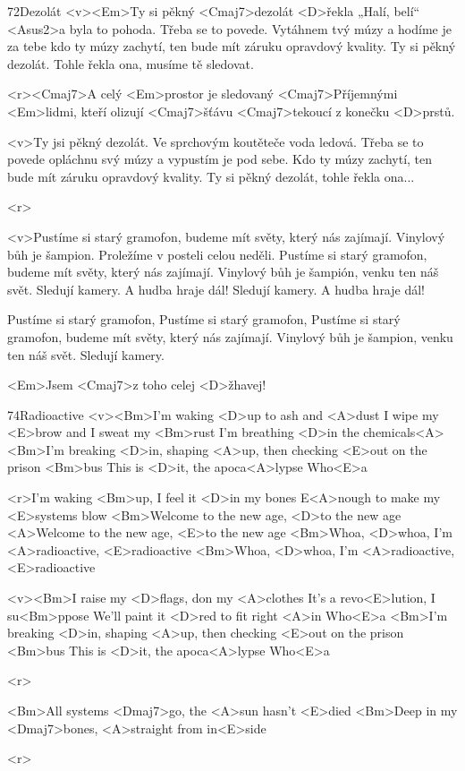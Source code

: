 \begin{song}{72}{Dezolát}{}
	<v><Em>Ty si pěkný <Cmaj7>dezolát
	<D>řekla „Halí, belí“ <Asus2>a byla to pohoda.
	Třeba se to povede.
	Vytáhnem tvý múzy
	a hodíme je za tebe
	kdo ty múzy zachytí,
	ten bude mít záruku
	opravdový kvality.
	Ty si pěkný dezolát.
	Tohle řekla ona,
	musíme tě sledovat.

	<r><Cmaj7>A celý <Em>prostor je sledovaný
	<Cmaj7>Příjemnými <Em>lidmi, kteří olizují
	<Cmaj7>šťávu <Cmaj7>tekoucí
	z konečku <D>prstů.

	<v>Ty jsi pěkný dezolát. Ve sprchovým koutěteče voda ledová.
	Třeba se to povede opláchnu svý múzy a vypustím je pod sebe.
	Kdo ty múzy zachytí, ten bude mít záruku opravdový kvality. 
	Ty si pěkný dezolát, tohle řekla ona...

	<r>

	<v>Pustíme si starý gramofon, budeme mít světy, který nás zajímají.
	Vinylový bůh je šampion. Proležíme v posteli celou neděli.
	Pustíme si starý gramofon, budeme mít světy, který nás zajímají.
	Vinylový bůh je šampión, venku ten náš svět. Sledují kamery.
	A hudba hraje dál! Sledují kamery.
	A hudba hraje dál!

	Pustíme si starý gramofon,
	Pustíme si starý gramofon,
	Pustíme si starý gramofon, budeme mít světy, který nás zajímají.
	Vinylový bůh je šampion, venku ten náš svět. Sledují kamery.

	<Em>Jsem <Cmaj7>z toho celej <D>žhavej!
\end{song}
\begin{song}{74}{Radioactive}{}
	<v><Bm>I'm waking <D>up to ash and <A>dust
	I wipe my <E>brow and I sweat my <Bm>rust
	I'm breathing <D>in the chemicals<A>
	<Bm>I'm breaking <D>in, shaping <A>up, then checking <E>out on the prison <Bm>bus
	This is <D>it, the apoca<A>lypse
	Who<E>a

	<r>I'm waking <Bm>up, I feel it <D>in my bones
	E<A>nough to make my <E>systems blow
	<Bm>Welcome to the new age, <D>to the new age
	<A>Welcome to the new age, <E>to the new age
	<Bm>Whoa, <D>whoa, I'm <A>radioactive, <E>radioactive
	<Bm>Whoa, <D>whoa, I'm <A>radioactive, <E>radioactive

	<v><Bm>I raise my <D>flags, don my <A>clothes
	It's a revo<E>lution, I su<Bm>ppose
	We'll paint it <D>red to fit right <A>in
	Who<E>a
	<Bm>I'm breaking <D>in, shaping <A>up, then checking <E>out on the prison <Bm>bus
	This is <D>it, the apoca<A>lypse
	Who<E>a

	<r>

	<Bm>All systems <Dmaj7>go, the <A>sun hasn't <E>died
	<Bm>Deep in my <Dmaj7>bones, <A>straight from in<E>side

	<r>
\end{song}
